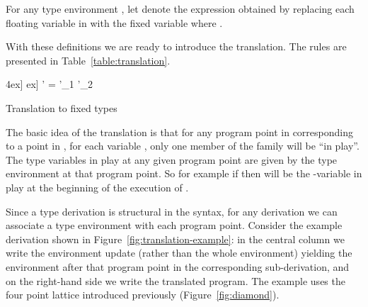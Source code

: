 \documentclass{sigplanconf}
\begin{document}
\begin{table}
\begin{definition}
For any type environment ,
let  denote the expression obtained by replacing each floating variable  in   with the fixed variable  where .
\end{definition}

With these definitions we are ready to introduce the translation. 
The rules are presented in Table~\ref{table:translation}.
\begin{table*}
\begin{center}
4ex]
\4ex]
         \quad \Gamma' = \Gamma'_1 \lub \Gamma'_2
\
\end{center}
\caption{Translation to fixed types}
\label{table:translation}
\end{table*}

The basic idea of the translation 
is that for any program point in  corresponding to a point in ,
for each variable , 
only one member of the family   will be ``in
play''. The type variables in play at any given program point are given by the type environment
at that program point. So for example if 
then  will be the -variable in play at the beginning of
the execution of . 

\begin{example}
Since a type derivation is structural in the syntax, for any derivation we can associate
a type environment with each program point.
Consider the example derivation shown in Figure~\ref{fig:translation-example}:
in the central column we write the environment update (rather than the whole environment)
yielding the environment after that program point
in the corresponding sub-derivation, and on the right-hand side we write the translated program. 
The example uses the four point lattice introduced previously
(Figure~\ref{fig:diamond}).


\end{example}
\end{table}
\end{document}
